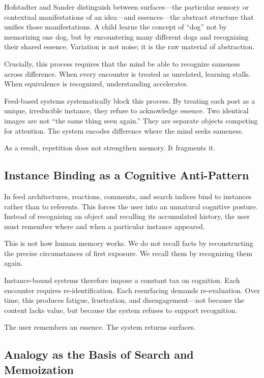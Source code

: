 \documentclass[11pt,oneside]{article}
\begin{document}
Hofstadter and Sander distinguish between surfaces—the particular sensory or contextual manifestations of an idea—and essences—the abstract structure that unifies those manifestations. A child learns the concept of “dog” not by memorizing one dog, but by encountering many different dogs and recognizing their shared essence. Variation is not noise; it is the raw material of abstraction.

Crucially, this process requires that the mind be able to recognize sameness across difference. When every encounter is treated as unrelated, learning stalls. When equivalence is recognized, understanding accelerates.

Feed-based systems systematically block this process. By treating each post as a unique, irreducible instance, they refuse to acknowledge essence. Two identical images are not “the same thing seen again.” They are separate objects competing for attention. The system encodes difference where the mind seeks sameness.

As a result, repetition does not strengthen memory. It fragments it.

\subsection{Instance Binding as a Cognitive Anti-Pattern}

In feed architectures, reactions, comments, and search indices bind to instances rather than to referents. This forces the user into an unnatural cognitive posture. Instead of recognizing an object and recalling its accumulated history, the user must remember where and when a particular instance appeared.

This is not how human memory works. We do not recall facts by reconstructing the precise circumstances of first exposure. We recall them by recognizing them again.

Instance-bound systems therefore impose a constant tax on cognition. Each encounter requires re-identification. Each resurfacing demands re-evaluation. Over time, this produces fatigue, frustration, and disengagement—not because the content lacks value, but because the system refuses to support recognition.

The user remembers an essence. The system returns surfaces.

\subsection{Analogy as the Basis of Search and Memoization}
\end{document}
